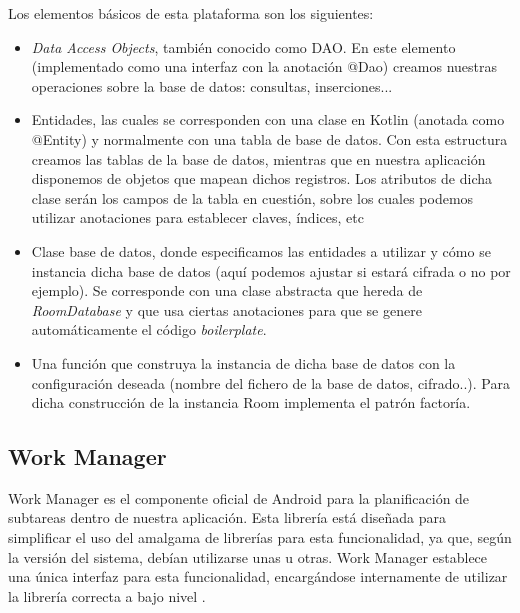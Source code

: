             Los elementos básicos de esta plataforma son los siguientes:
            \begin{itemize}
                \item \textit{Data Access Objects}, también conocido como DAO. En este elemento (implementado como
                una interfaz con la anotación @Dao) creamos nuestras
                operaciones sobre la base de datos: consultas, inserciones...
                \item Entidades, las cuales se corresponden con una clase en Kotlin (anotada como @Entity)
                y normalmente con una tabla de base de datos.
                Con esta estructura creamos las tablas de la base de datos, mientras que en nuestra aplicación 
                disponemos de objetos que mapean dichos registros. Los atributos de dicha clase serán los campos de
                la tabla en cuestión, sobre los cuales podemos utilizar anotaciones para establecer claves, índices, etc
                \item Clase base de datos, donde especificamos las entidades a utilizar y cómo se instancia dicha base
                de datos (aquí podemos ajustar si estará cifrada o no por ejemplo). Se corresponde con una clase 
                abstracta que hereda de \textit{RoomDatabase} y que usa ciertas anotaciones para que se genere 
                automáticamente el código \textit{boilerplate}.
                \item Una función que construya la instancia de dicha base de datos con la configuración deseada
                (nombre del fichero de la base de datos, cifrado..). Para dicha construcción de la instancia Room
                implementa el patrón factoría.
            \end{itemize}
        
        \subsection{Work Manager}
            Work Manager es el componente oficial de Android para la planificación de subtareas dentro de nuestra 
            aplicación. Esta librería está diseñada para simplificar el uso del amalgama de librerías para esta
            funcionalidad, ya que, según la versión del sistema, debían utilizarse unas u otras. Work Manager establece
            una única interfaz para esta funcionalidad, encargándose internamente de utilizar la librería correcta a
            bajo nivel \cite{noauthor_workmanager_nodate}.
            
